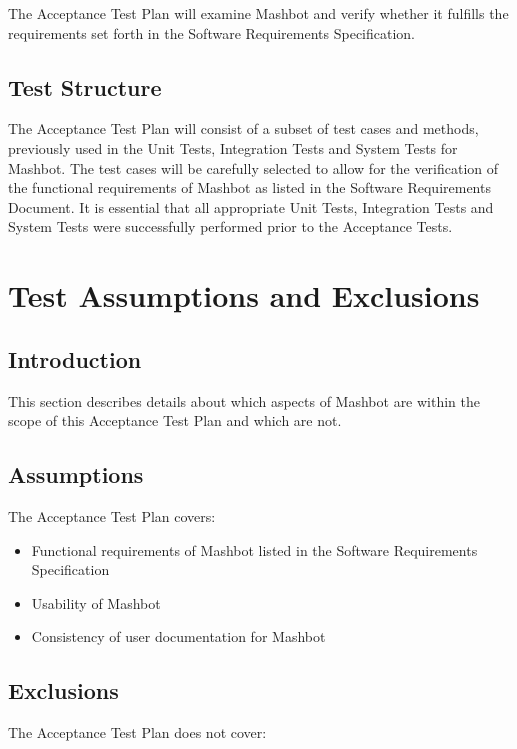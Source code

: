 \documentclass{article}
\begin{document}
The Acceptance Test Plan will examine Mashbot and verify
whether it fulfills the requirements set forth in the Software
Requirements Specification.


\subsection{Test Structure}

The Acceptance Test Plan will consist of a subset of test cases and
methods, previously used in the Unit Tests, Integration Tests and
System Tests for Mashbot. The test cases will be carefully selected to
allow for the verification of the functional requirements of Mashbot
as listed in the Software Requirements Document. It is essential that
all appropriate Unit Tests, Integration Tests and System Tests were
successfully performed prior to the Acceptance Tests.

\section{Test Assumptions and Exclusions} %

\subsection{Introduction}

This section describes details about which aspects of Mashbot are
within the scope of this Acceptance Test Plan and which are not.

\subsection{Assumptions}

The Acceptance Test Plan covers:

\begin{itemize}
\item Functional requirements of Mashbot listed in the Software
Requirements Specification
\item Usability of Mashbot
\item Consistency of user documentation for Mashbot
\end{itemize}

\subsection{Exclusions}

The Acceptance Test Plan does not cover:
\end{document}
